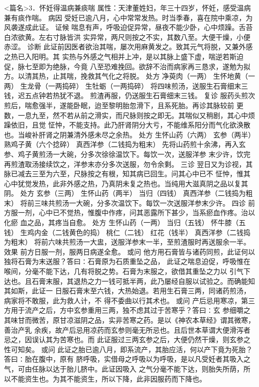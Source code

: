 \documentclass[a4paper,12pt,UTF8,twoside]{ctexbook}
\begin{document}
<篇名>3．怀妊得温病兼痰喘
属性：天津董姓妇，年三十四岁，怀妊，感受温病兼有痰作喘。 
病因 受妊已逾八月，心中常常发热。时当季春，喜在院中乘凉，为风袭遂成此证。 
证候 喘息有声，呼吸迫促异常，昼夜不能少卧，心中烦躁。舌苔白浓欲黄。左右寸脉皆洪 
实异常，两尺则按之不实，其数八至。大便干燥，小便赤涩。 
诊断 此证前因医者欲治其喘，屡次用麻黄发之。致其元气将脱，又兼外感之热已入阳明。其 
实热与外感之气相并上冲，是以其脉上盛下虚，喘逆若斯迫促，脉七至即为绝脉，今竟 
八至恐难挽回。欲辞不治而病家再三恳求，遂勉为拟方。以清其热，止其喘，挽救其气化之将脱。 
处方 净萸肉（一两） 生怀地黄（一两） 生龙骨（一两捣碎） 生牡蛎（一两捣碎） 
将四味煎汤，送服生石膏细末三钱，迟五点钟若热犹不退。 
煎渣再服，仍送服生石膏细末三钱。 
复诊 服药头煎次煎后，喘愈强半，遂能卧眠，迨至黎明胎忽滑下，且系死胎。再诊其脉较前 
更数，一息九至，然不若从前之滑实，而尺脉则按之即无。其喘似又稍剧，其心中烦躁依旧，且觉 
怔忡，不能支持。此乃肝肾阴分大亏，不能维系阳分而气化欲涣散也。当峻补肝肾之阴兼清外感未尽之余热。 
处方 生怀山药（六两） 玄参（两半） 熟鸡子黄（六个捻碎） 真西洋参（二钱捣为粗末） 
先将山药煎十余沸，再入玄参、鸡子黄煎汤一大碗，分多次徐徐温饮下。每饮一次，送服洋参 
末少许，饮完再煎渣取汤接续饮之，洋参末亦分多次送服，勿令余剩。 
三诊 翌日又为诊视，其脉已减去三至为六至，尺脉按之有根，知其病已回生。问其心中已不 
怔忡，惟其心中犹觉发热，此非外感之热，乃真阴未复之热也。当纯用大滋真阴之品以复其阴。 
处方 玄参（三两） 生怀山药（两半） 当归（四钱） 真西洋参（二钱捣为粗末） 
将前三味共煎汤一大碗，分多次温饮下。每饮一次送服洋参末少许。 
四诊 前方服一剂，心中已不觉热，惟腹中作疼，问其恶露所下甚少，当系瘀血作疼。治以化瘀 
血之品，其疼当自愈。 
处方 生怀山药（一两） 当归（五钱） 怀牛膝（五钱） 生鸡内金（二钱黄色的捣） 
桃仁（二钱） 红花（钱半） 真西洋参（二钱捣为粗末） 
将前六味共煎汤一大盅，送服洋参末一半，至煎渣服时再送服余一半。 
效果 前方日服一剂，服两日病遂全愈。 
或问 他方用石膏皆与诸药同煎，此证何以独将石膏为末送服？答曰∶石膏原为石质重坠之品， 
此证之喘息迫促，呼吸惟在喉间，分毫不能下达，几有将脱之势。石膏为末服之，欲借其重坠之力以 
引气下达也。且石膏末服，其退热之力一钱可抵半两，此乃屡经自服以试验之。而确能知其如斯，此证一 
日服石膏末至六钱，大热始退。若用生石膏三两，同诸药煎汤，病家将不敢服，此为救人计，不 
得不委曲以行其术也。 
或问 产后忌用寒凉，第三方用于流产之后，方中玄参重用三两，独不虑其过于苦寒乎？答曰∶玄 
参细嚼之其味甘而微苦，原甘凉滋阴之品，实非苦寒之药。是以《神农本草经》谓其微寒，善治产乳 
余疾，故产后忌用凉药而玄参则毫无所忌也。且后世本草谓大便滑泻者忌之，因误认其为苦寒也。而 
此证服过三两玄参之后，大便仍然干燥，则玄参之性可知矣。 
或问 此证之胎已逾八月，即系流产，其胎应活，何以产下竟为死胎？答曰∶胎在腹中，原有 
脐呼吸，实借母之呼吸以为呼吸，是以凡受妊者其吸入之气，可由任脉以达于胎儿脐中。此证因吸入 
之气分毫不能下达，则胎失所荫，所以不能资生也。为其不能资生，所以下降，此非因服药而下降也。 
\end{document}

